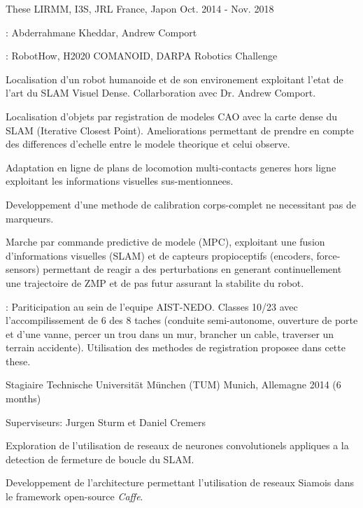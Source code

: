 \begin{cventries}
  \cventry
    {These} %
    {LIRMM, I3S, JRL} %
    {France, Japon} %
    {Oct. 2014 - Nov. 2018} %
    {
      \begin{cvitems} %
        \item {}: Abderrahmane Kheddar, Andrew Comport 
        \item {}: RobotHow, H2020 COMANOID, DARPA Robotics Challenge
        \item Localisation d'un robot humanoide et de son environement exploitant l'etat de l'art du SLAM Visuel Dense. Collarboration avec Dr. Andrew Comport.
        \item Localisation d'objets par registration de modeles CAO avec la carte dense du SLAM (Iterative Closest Point). Ameliorations permettant de prendre en compte des differences d'echelle entre le modele theorique et celui observe.
        \item Adaptation en ligne de plans de locomotion multi-contacts generes hors ligne exploitant les informations visuelles sus-mentionnees. 
        \item Developpement d'une methode de calibration corps-complet ne necessitant pas de marqueurs.
        \item Marche par commande predictive de modele (MPC), exploitant une fusion d'informations visuelles (SLAM) et de capteurs propioceptifs (encoders, force-sensors) permettant de reagir a des perturbations en generant continuellement une trajectoire de ZMP et de pas futur assurant la stabilite du robot.
        \item {}: Pariticipation au sein de l'equipe AIST-NEDO. Classes 10/23 avec l'accompilissement de 6 des 8 taches (conduite semi-autonome, ouverture de porte et d'une vanne, percer un trou dans un mur, brancher un cable, traverser un terrain accidente). Utilisation des methodes de registration proposee dans cette these.
      \end{cvitems}
    }

  \cventry
    {Stagiaire} %
    {Technische Universität München (TUM)} %
    {Munich, Allemagne} %
    {2014 (6 months)} %
    {
      \begin{cvitems} %
        \item Superviseurs: Jurgen Sturm et Daniel Cremers
        \item Exploration de l'utilisation de reseaux de neurones convolutionels appliques a la detection de fermeture de boucle du SLAM.
        \item Developpement de l'architecture permettant l'utilisation de reseaux Siamois dans le framework open-source \emph{Caffe}.
      \end{cvitems}
    }


\end{cventries}
